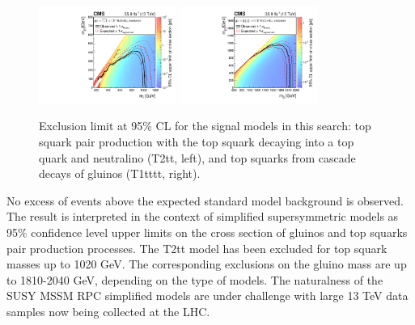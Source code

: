 \documentclass{PoS}
\begin{document}
\begin{figure}[ht!]
 \begin{centering}
  \includegraphics[width=0.40\textwidth]{figures/Covered_T2tt_OnlyXSEC.pdf}
  \includegraphics[width=0.40\textwidth]{figures/T1tttt_OnlyXSEC.pdf}
  \caption{Exclusion limit at 95\% CL for the signal models in this search: top squark pair production with the top squark decaying into a top quark and neutralino (T2tt, left), and top squarks from cascade decays of gluinos (T1tttt, right).}
  \label{fig:signal_results}
 \end{centering}
\end{figure}

No excess of events above the expected standard model background is observed. The result is interpreted in the context of simplified supersymmetric models as 95\% confidence level upper limits on the cross section of gluinos and top squarks pair production processes. The T2tt model has been excluded for top squark masses up to 1020 GeV. The corresponding exclusions on the gluino mass are up to 1810-2040 GeV, depending on the type of models. The naturalness\cite{Papucci:2011wy} of the SUSY MSSM RPC simplified models are under challenge with large 13 TeV data samples now being collected at the LHC.

\clearpage


\end{document}
